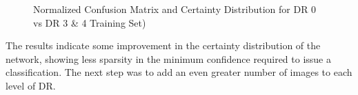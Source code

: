 \documentclass[letterpaper,12pt]{article}
\begin{document}
\begin{figure}[htbp]
\begin{center}
\caption{Normalized Confusion Matrix and Certainty Distribution for DR 0 vs DR 3 \& 4 Training Set)}
\label{DR0_DR3_4}
\end{center}
\end{figure}

The results indicate some improvement in the certainty distribution of the network, showing less sparsity in the minimum confidence required to issue a classification. The next step was to add an even greater number of images to each level of DR.
\end{document}
